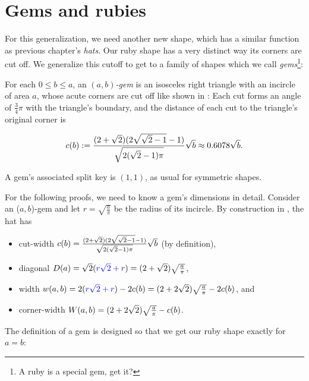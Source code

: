 \documentclass[a4paper,style=print,bibliography=totoc,nexus,lnum,extramargin]{tubsbook}
\begin{document}
\section{Gems and rubies}

For this generalization, we need another new shape, which has a similar function as previous chapter's \emph{hats}. Our ruby shape has a very distinct way its corners are cut off. We generalize this cutoff to get to a family of shapes which we call \emph{gems}\footnote{A ruby is a special gem, get it?}:

\begin{definition}
    For each $0 \le b \le a$, an \emph{$(a,b)$-gem} is an isosceles right triangle with an incircle of area $a$, whose acute corners are cut off like shown in : Each cut forms an angle of $\frac3 4\pi$ with the triangle's boundary, and the distance of each cut to the triangle's original corner is

    $$c(b) := \frac{(2+\sqrt{2})(2\sqrt{\sqrt{2}-1}-1)}{\sqrt{2(\sqrt{2}-1)\pi}}\sqrt{b} \approx 0.6078 \sqrt{b}.$$

\end{definition}


\begin{definition}
    A gem's associated split key is $(1,1)$, as usual for symmetric shapes.
\end{definition}

For the following proofs, we need to know a gem's dimensions in detail.
Consider an ($a,b$)-gem and let $r = \sqrt{\frac{a}{\pi}}$ be the radius of its incircle. By construction in , the hat has
\begin{itemize}
    \item cut-width $c(b) = \frac{(2+\sqrt{2})(2\sqrt{\sqrt{2}-1}-1)}{\sqrt{2(\sqrt{2}-1)\pi}}\sqrt{b}$ (by definition),
    \item diagonal $D(a) = \sqrt{2}(\textcolor{blue}{r\sqrt{2}+r}) = (2+\sqrt{2})\sqrt{\frac{a}{\pi}}$,
    \item width $w(a,b) = 2(\textcolor{blue}{r\sqrt{2}+r}) - 2c(b) = (2+2\sqrt{2})\sqrt{\frac{a}{\pi}} - 2c(b)$, and
    \item corner-width $W(a,b) = (2+2\sqrt{2})\sqrt{\frac{a}{\pi}} - c(b)$.
\end{itemize}


The definition of a gem is designed so that we get our ruby shape exactly for $a = b$:
\end{document}
